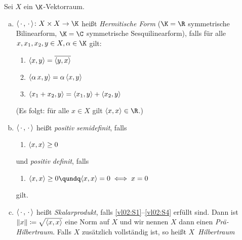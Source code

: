 \begin{thEmpty}[Skalarprodukt] \label{vl02:sp}
    Sei $X$ ein $\K$-Vektorraum.
    \begin{enumerate}[(a)]
        \item \label{vl02:sp:hermitischeform}
            $\emptySP\colon X\times X \to \K$ heißt \emph{Hermitische Form}
            ($\K=\R$ symmetrische Bilinearform, $\K=\C$ symmetrische
            Sesquilinearform), falls für alle $x,x_1,x_2,y\in X,\alpha\in\K$ gilt:
            \begin{enumerate}[({S}1),labelsep=1em,leftmargin=2cm]
                \item\label{vl02:S1}
                    $\left\langle x,y\right\rangle = \overline{\left\langle y,x\right\rangle}$
                \item\label{vl02:S2}
                    $\SP{\alpha\,x,y} = \alpha\,\SP{x,y}$
                \item\label{vl02:S3}
                    $\left\langle x_1+x_2,y\right\rangle = \left\langle x_1,y\right\rangle + \left\langle x_2,y\right\rangle$
            \end{enumerate}
            (Es folgt: für alle $x\in X$ gilt $\SP{x,x}\in\R$.)

        \item \label{vl02:sp:posdefinit}
            $\left\langle\,\cdot\,,\,\cdot\,\right\rangle$ heißt \emph{positiv semidefinit}, falls
            \begin{enumerate}[({S}4'),labelsep=1em,leftmargin=2cm]
                \item\label{vl02:S4p}
                    $\left\langle x,x\right\rangle \geq 0$
            \end{enumerate}
            und \emph{positiv definit}, falls
            \begin{enumerate}[({S}4),labelsep=1em,leftmargin=2cm]
                \item\label{vl02:S4}
                    $\SP{x,x} \geq 0 \qundq \SP{x,x}=0 \iff x=0$
            \end{enumerate}
            gilt.

        \item \label{vl02:sp:hilbertraum}
            $\left\langle\,\cdot\,,\,\cdot\,\right\rangle$ heißt \emph{Skalarprodukt}, falls 
            \ref{vl02:S1}--\ref{vl02:S4} erfüllt sind.
            Dann ist $\lVert x\rVert\coloneqq\sqrt{\left\langle x,x\right\rangle}$ eine Norm auf $X$ und wir
            nennen $X$ dann einen \emph{Prä-Hilbertraum}.
            Falls $X$ zusätzlich vollständig ist, so heißt $X$~\emph{Hilbertraum}
            

\end{enumerate}
\end{thEmpty}
